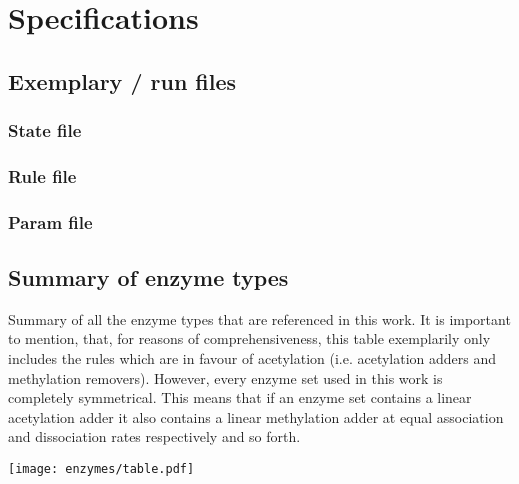 \chapter{Specifications}
    \label{app:RunSpec}

    \section{Exemplary \ed/ run files}
        \subsection{State file}
            \label{app:statefile}
            
        \subsection{Rule file}
            \label{app:rulefile}
            
        \subsection{Param file}
            \label{app:paramfile}
            

    \newpage
    \section{Summary of enzyme types}

        \begin{table}[htbp!]
            \caption{Summary of all the enzyme types that are referenced in this work. It is important to mention, that, for reasons of comprehensiveness, this table exemplarily only includes the rules which are in favour of acetylation (i.e. acetylation adders and methylation removers). However, every enzyme set used in this work is completely symmetrical. This means that if an enzyme set contains a linear acetylation adder it also contains a linear methylation adder at equal association and dissociation rates respectively and so forth.}
            \texttt{[image: enzymes/table.pdf]}
            \label{img:enzymeTypeSummary}
        \end{table}

